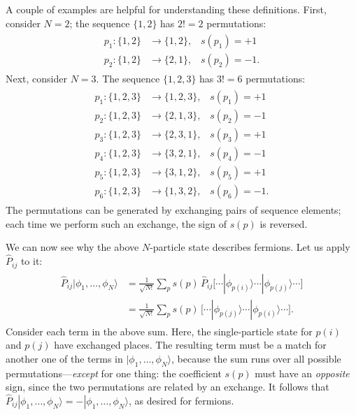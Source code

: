 \documentclass[pra,12pt]{revtex4}
\begin{document}
A couple of examples are helpful for understanding these definitions.
First, consider $N=2$; the sequence $\{1,2\}$ has $2! = 2$ permutations:
\begin{align}
  \begin{aligned}p_1 : \{1,2\} &\rightarrow \{1,2\}, \;\;\;s(p_1) = +1 \\ p_2 : \{1,2\} &\rightarrow \{2,1\}, \;\;\;s(p_2) = -1.\end{aligned}
\end{align}
Next, consider $N=3$.  The sequence $\{1,2,3\}$ has $3!=6$ permutations:
\begin{align}
  \begin{aligned}
  p_1 : \{1,2,3\} &\rightarrow \{1,2,3\}, \;\;\;s(p_1) = +1 \\
  p_2 : \{1,2,3\} &\rightarrow \{2,1,3\}, \;\;\;s(p_2) = -1 \\
  p_3 : \{1,2,3\} &\rightarrow \{2,3,1\}, \;\;\;s(p_3) = +1 \\
  p_4 : \{1,2,3\} &\rightarrow \{3,2,1\}, \;\;\;s(p_4) = -1 \\
  p_5 : \{1,2,3\} &\rightarrow \{3,1,2\}, \;\;\;s(p_5) = +1 \\
  p_6 : \{1,2,3\} &\rightarrow \{1,3,2\}, \;\;\;s(p_6) = -1.\end{aligned}
\end{align}
The permutations can be generated by exchanging pairs of sequence
elements; each time we perform such an exchange, the sign of $s(p)$
is reversed.

We can now see why the above $N$-particle state describes fermions.
Let us apply $\hat{P}_{ij}$ to it:
\begin{align}
  \begin{aligned}\hat{P}_{ij}|\phi_1,\dots,\phi_N\rangle &= \frac{1}{\sqrt{N!}} \sum_p s(p)\, \hat{P}_{ij} \big[\cdots |\phi_{p(i)}\rangle \cdots |\phi_{p(j)}\rangle \cdots\big] \\&= \frac{1}{\sqrt{N!}} \sum_p s(p)\, \big[\cdots |\phi_{p(j)}\rangle \cdots |\phi_{p(i)}\rangle \cdots\big].\end{aligned}
\end{align}
Consider each term in the above sum.  Here, the single-particle state
for $p(i)$ and $p(j)$ have exchanged places.  The resulting term must
be a match for another one of the terms in
$|\phi_1,\dots,\phi_N\rangle$, because the sum runs over all possible
permutations---\textit{except} for one thing: the coefficient $s(p)$
must have an \textit{opposite} sign, since the two permutations are
related by an exchange.  It follows that
$\hat{P}_{ij}|\phi_1,\dots,\phi_N\rangle = -
|\phi_1,\dots,\phi_N\rangle$, as desired for fermions.
\end{document}
